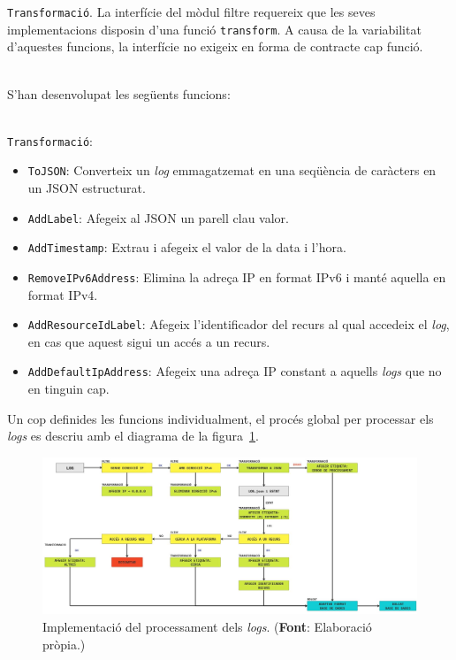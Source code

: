 \clearpage

\noindent
\texttt{Transformació}.
La interfície del mòdul filtre requereix que les seves implementacions disposin d'una funció \texttt{transform}.
A causa de la variabilitat d'aquestes funcions, la interfície no exigeix en forma de contracte cap funció.

\noindent \\
S'han desenvolupat les següents funcions:

\noindent \\
\texttt{Transformació}:
\begin{itemize}
    \item \texttt{ToJSON}: Converteix un \textit{\gls{log}} emmagatzemat en una seqüència de caràcters en un \gls{JSON} estructurat.
    \item \texttt{AddLabel}: Afegeix al JSON un parell clau valor.
    \item \texttt{AddTimestamp}: Extrau i afegeix el valor de la data i l'hora.
    \item \texttt{RemoveIPv6Address}: Elimina la adreça \gls{IP} en format IPv6 i manté aquella en format IPv4.
    \item \texttt{AddResourceIdLabel}: Afegeix l'identificador del recurs al qual accedeix el \textit{log}, en cas que aquest sigui un accés a un recurs.
    \item \texttt{AddDefaultIpAddress}: Afegeix una adreça \gls{IP} constant a aquells \textit{\gls{log}s} que no en tinguin cap.
\end{itemize}

\noindent
Un cop definides les funcions individualment, el procés global per processar els \textit{\gls{log}s} es descriu amb el diagrama de la figura~\ref{fig:log-processing-workflow}.

\noindent
\begin{figure}[htbp]
    \centerline{\includegraphics[width=1.1\textwidth]{figures/log-processing-workflow}}
    \captionsetup{justification=centering}
    \caption[Implementació del processament dels \textit{logs}.]{Implementació del processament dels \textit{logs}. (\textbf{Font}: Elaboració pròpia.)}\label{fig:log-processing-workflow}
\end{figure}